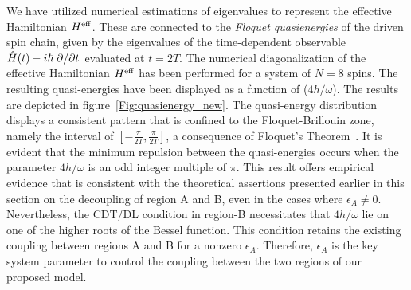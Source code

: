 \documentclass[12pt]{iopart}
\begin{document}
We have utilized numerical estimations of eigenvalues to represent the effective Hamiltonian $H^{\rm eff}$. These are connected to the \textit{ Floquet quasienergies} of the driven spin chain, given by the eigenvalues of the time-dependent observable $\hat{H}(t)-i\hbar\pdv*{}{t}$ evaluated at $t=2T$. The numerical diagonalization of the effective Hamiltonian $H^{\rm eff}$ has been performed for a system of $N=8$ spins. The resulting quasi-energies have been displayed as a function of ($4h/\omega$). The results are depicted in figure~\ref{Fig:quasienergy_new}. The quasi-energy distribution displays a consistent pattern that is confined to the Floquet-Brillouin zone, namely the interval of $[-\frac{\pi}{2T}, \frac{\pi}{2T}]$, a consequence of Floquet's Theorem~\cite{dutta2014}. It is evident that the minimum repulsion between the quasi-energies occurs when the parameter $4h/\omega$ is an odd integer multiple of $\pi$. This result offers empirical evidence that is consistent with the theoretical assertions presented earlier in this section on the decoupling of region A and B, even in the cases where $\epsilon_A \neq 0$. Nevertheless, the CDT/DL condition in region-B necessitates that $4h/\omega$ lie on one of the higher roots of the Bessel function. This condition retains the existing coupling between regions A and B for a nonzero $\epsilon_A$. Therefore, $\epsilon_A$ is the key system parameter to control the coupling between the two regions of our proposed model. 	
	
\end{document}
